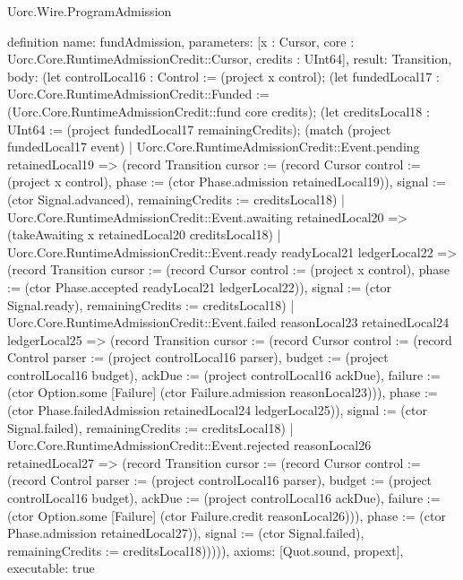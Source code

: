 \begin{lexlean}{Uorc.Wire.ProgramAdmission}
\begin{semanticmodule}
definition{
  name: fundAdmission,
  parameters: [x : Cursor, core : Uorc.Core.RuntimeAdmissionCredit::Cursor, credits : UInt64],
  result: Transition,
  body: (let controlLocal16 : Control := (project x control); (let fundedLocal17 : Uorc.Core.RuntimeAdmissionCredit::Funded := (Uorc.Core.RuntimeAdmissionCredit::fund core credits); (let creditsLocal18 : UInt64 := (project fundedLocal17 remainingCredits); (match (project fundedLocal17 event)
    | Uorc.Core.RuntimeAdmissionCredit::Event.pending retainedLocal19 => (record Transition {cursor := (record Cursor {control := (project x control), phase := (ctor Phase.admission retainedLocal19)}), signal := (ctor Signal.advanced), remainingCredits := creditsLocal18})
    | Uorc.Core.RuntimeAdmissionCredit::Event.awaiting retainedLocal20 => (takeAwaiting x retainedLocal20 creditsLocal18)
    | Uorc.Core.RuntimeAdmissionCredit::Event.ready readyLocal21 ledgerLocal22 => (record Transition {cursor := (record Cursor {control := (project x control), phase := (ctor Phase.accepted readyLocal21 ledgerLocal22)}), signal := (ctor Signal.ready), remainingCredits := creditsLocal18})
    | Uorc.Core.RuntimeAdmissionCredit::Event.failed reasonLocal23 retainedLocal24 ledgerLocal25 => (record Transition {cursor := (record Cursor {control := (record Control {parser := (project controlLocal16 parser), budget := (project controlLocal16 budget), ackDue := (project controlLocal16 ackDue), failure := (ctor Option.some [Failure] (ctor Failure.admission reasonLocal23))}), phase := (ctor Phase.failedAdmission retainedLocal24 ledgerLocal25)}), signal := (ctor Signal.failed), remainingCredits := creditsLocal18})
    | Uorc.Core.RuntimeAdmissionCredit::Event.rejected reasonLocal26 retainedLocal27 => (record Transition {cursor := (record Cursor {control := (record Control {parser := (project controlLocal16 parser), budget := (project controlLocal16 budget), ackDue := (project controlLocal16 ackDue), failure := (ctor Option.some [Failure] (ctor Failure.credit reasonLocal26))}), phase := (ctor Phase.admission retainedLocal27)}), signal := (ctor Signal.failed), remainingCredits := creditsLocal18}))))),
  axioms: [Quot.sound, propext],
  executable: true
}


\end{semanticmodule}
\end{lexlean}
